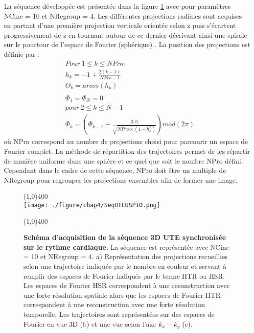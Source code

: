La séquence développée est présentée dans la figure \ref{fig:SeqUTEUSPIO} avec pour paramètres NCine = 10 et NRegroup = 4. Les différentes projections radiales sont acquises en partant d'une première projection verticale orientée selon z puis s'écartent progressivement de z en tournant autour de ce dernier décrivant ainsi une spirale sur le pourtour de l'espace de Fourier (sphérique) \cite{Saff1997}.
 La position des projections est définie par :
\begin{equation}
\begin{split}
	& Pour \ 1 \leq k \leq NPro : \\ 
	& h_k = -1+\frac{2(k-1)}{NPro-1} \\
	& \Theta_k = arcos(h_k) \\
	& \\
	& \Phi_1=\Phi_N=0 \\	
	& pour \ 2 \leq k \leq N-1 \\
	& \Phi_k=\left( \Phi_{k-1}+\frac{3,6}{\sqrt{NPro\times (1-h_k^2)}} \right)mod(2 \pi)	
\end{split}
\end{equation}
où NPro correspond au nombre de projections choisi pour parcourir un espace de Fourier complet. La méthode de répartition des trajectoires permet de les répartir de manière uniforme dans une sphère et ce quel que soit le nombre NPro défini. Cependant dans le cadre de cette séquence, NPro doit être un multiple de NRegroup pour regrouper les projections ensembles afin de former une image.

\begin{figure}[H]
\centering
\line(1,0){400} \\
\texttt{[image: ./figure/chap4/SeqUTEUSPIO.png]}
\caption[Schéma d'acquisition de la séquence 3D UTE synchronisée sur le rythme cardiaque.]{\label{fig:SeqUTEUSPIO} \textbf{Schéma d'acquisition de la séquence 3D UTE synchronisée sur le rythme cardiaque.} La séquence est représentée avec NCine = 10 et NRegroup = 4. a) Représentation des projections recueillies selon une trajectoire indiquée par le nombre en couleur et servant à remplir des espaces de Fourier indiqués par le terme HTR ou HSR. Les espaces de Fourier HSR correspondent à une reconstruction avec une forte résolution spatiale alors que les espaces de Fourier HTR correspondent à une reconstruction avec une forte résolution temporelle. Les trajectoires sont représentées sur des espaces de Fourier en vue 3D (b) et une vue selon l'axe $k_x - k_y$ (c).}
\line(1,0){400} \\ 
\end{figure}

